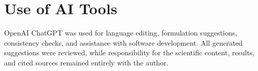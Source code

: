\documentclass[english,bachelor,uks]{webisthesis} %
\begin{document}



















\clearpage
\section*{Use of AI Tools}

OpenAI ChatGPT was used for language editing, formulation suggestions, consistency checks, and assistance with software development. All generated suggestions were reviewed, while responsibility for the scientific content, results, and cited sources remained entirely with the author.

\appendix

\end{document}

